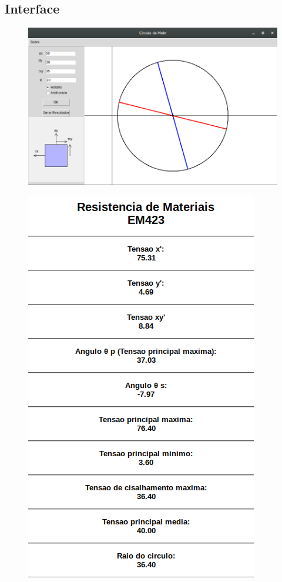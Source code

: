 \documentclass[a4paper]{article}
\begin{document}
\subsection{Interface}

	\begin{figure}[!htb]
			\includegraphics[scale = 0.4]{interfacecirculo}
	\end{figure}	
		
	\begin{figure}[!htb]
		\includegraphics[scale = 0.4]{resultadohtml}
	\end{figure}	
\end{document}
